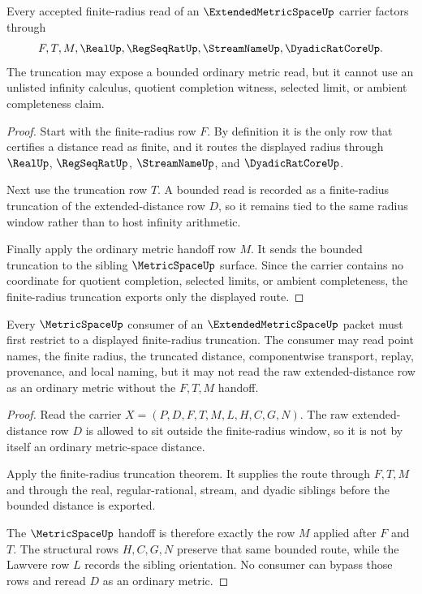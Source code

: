 \begin{theorem}
\label{thm:extended-metric-space-finite-radius-truncation}
Every accepted finite-radius read of an $\ExtendedMetricSpaceUp$ carrier factors through
$$
F,T,M,\RealUp,\RegSeqRatUp,\StreamNameUp,\DyadicRatCoreUp .
$$
The truncation may expose a bounded ordinary metric read, but it cannot use an unlisted infinity calculus, quotient completion witness, selected limit, or ambient completeness claim.
\end{theorem}
\begin{proof}
Start with the finite-radius row $F$. By definition it is the only row that certifies a distance read as finite, and it routes the displayed radius through $\RealUp$, $\RegSeqRatUp$, $\StreamNameUp$, and $\DyadicRatCoreUp$.

Next use the truncation row $T$. A bounded read is recorded as a finite-radius truncation of the extended-distance row $D$, so it remains tied to the same radius window rather than to host infinity arithmetic.

Finally apply the ordinary metric handoff row $M$. It sends the bounded truncation to the sibling $\MetricSpaceUp$ surface. Since the carrier contains no coordinate for quotient completion, selected limits, or ambient completeness, the finite-radius truncation exports only the displayed route.
\end{proof}

\begin{theorem}
\label{thm:extended-metric-space-metricspace-handoff}
Every $\MetricSpaceUp$ consumer of an $\ExtendedMetricSpaceUp$ packet must first restrict to a displayed finite-radius truncation. The consumer may read point names, the finite radius, the truncated distance, componentwise transport, replay, provenance, and local naming, but it may not read the raw extended-distance row as an ordinary metric without the $F,T,M$ handoff.
\end{theorem}
\begin{proof}
Read the carrier $X=(P,D,F,T,M,L,H,C,G,N)$. The raw extended-distance row $D$ is allowed to sit outside the finite-radius window, so it is not by itself an ordinary metric-space distance.

Apply the finite-radius truncation theorem. It supplies the route through $F,T,M$ and through the real, regular-rational, stream, and dyadic siblings before the bounded distance is exported.

The $\MetricSpaceUp$ handoff is therefore exactly the row $M$ applied after $F$ and $T$. The structural rows $H,C,G,N$ preserve that same bounded route, while the Lawvere row $L$ records the sibling orientation. No consumer can bypass those rows and reread $D$ as an ordinary metric.
\end{proof}

